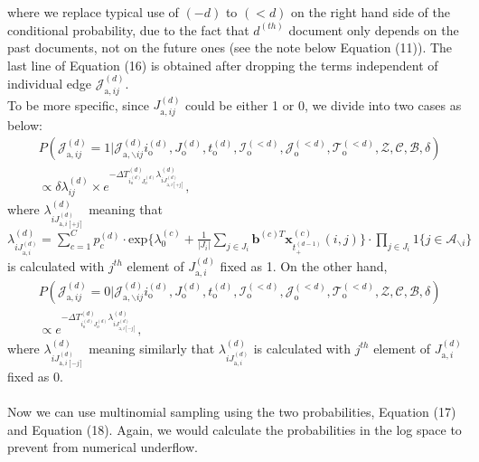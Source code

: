 \documentclass[a4paper]{article}
\begin{document}
      where we replace typical use of $(-d)$ to $(<d)$ on the right hand side of the conditional probability, due to the fact that $d^{(th)}$ document only depends on the past documents, not on the future ones (see the note below Equation (11)). The last line of Equation (16) is obtained after dropping the terms independent of individual edge $\mathcal{J}^{(d)}_{\mbox{a}, ij}$.\\ \newline
To be more specific, since ${J}^{(d)}_{\mbox{a}, ij}$ could be either 1 or 0, we divide into two cases as below:
      \begin{equation}
      \begin{aligned}
      &P(\mathcal{J}^{(d)}_{\mbox{a}, ij}=1| \mathcal{J}^{(d)}_{\mbox{a}, \backslash ij}  i^{(d)}_{\mbox{o}}, J^{(d)}_{\mbox{o}}, t^{(d)}_{\mbox{o}}, \mathcal{I}^{(<d)}_{\mbox{o}}, \mathcal{J}^{(<d)}_{\mbox{o}}, \mathcal{T}^{(<d)}_{\mbox{o}}, \mathcal{Z}, \mathcal{C}, \mathcal{B}, \delta)\\& \propto \delta\lambda^{(d)}_{ij}\times e^{-\Delta T^{(d)}_{i_o^{(d)}J_o^{(d)}}\lambda^{(d)}_{iJ^{(d)}_{\mbox{a}, i[+j]}}},
      \end{aligned}
      \end{equation}
      where $\lambda^{(d)}_{iJ^{(d)}_{\mbox{a}, i[+j]}}$ meaning that $\lambda^{(d)}_{iJ^{(d)}_{\mbox{a}, i}}=\sum\limits_{c=1}^{C} p^{(d)}_c\cdot\mbox{exp}\Big\{\lambda_0^{(c)}+\frac{1}{|J_i|}\sum\limits_{j \in{J_i}}\boldsymbol{b}^{(c)T}\boldsymbol{x}^{(c)}_{t^{(d-1)}_+}(i, j)\Big\}\cdot \prod\limits_{j \in J_i}1\{j \in \mathcal{A}_{\backslash i}\}$ is calculated with $j^{th}$ element of $J_{\mbox{a}, i}^{(d)}$ fixed as 1. On the other hand, 
     \begin{equation}
     \begin{aligned}
     &P(\mathcal{J}^{(d)}_{\mbox{a}, ij}=0| \mathcal{J}^{(d)}_{\mbox{a}, \backslash ij}  i^{(d)}_{\mbox{o}}, J^{(d)}_{\mbox{o}}, t^{(d)}_{\mbox{o}}, \mathcal{I}^{(<d)}_{\mbox{o}}, \mathcal{J}^{(<d)}_{\mbox{o}}, \mathcal{T}^{(<d)}_{\mbox{o}}, \mathcal{Z}, \mathcal{C}, \mathcal{B}, \delta)\\& \propto e^{-\Delta T^{(d)}_{i_o^{(d)}J_o^{(d)}}\lambda^{(d)}_{iJ^{(d)}_{\mbox{a}, i[-j]}}},
     \end{aligned}
     \end{equation}
       where $\lambda^{(d)}_{iJ^{(d)}_{\mbox{a}, i[-j]}}$ meaning similarly that $\lambda^{(d)}_{iJ^{(d)}_{\mbox{a}, i}}$ is calculated with $j^{th}$ element of $J_{\mbox{a}, i}^{(d)}$ fixed as 0. \\\\ \newline Now we can use multinomial sampling using the two probabilities, Equation (17) and Equation (18). Again, we would calculate the probabilities in the log space to prevent from numerical underflow. 
\end{document}
